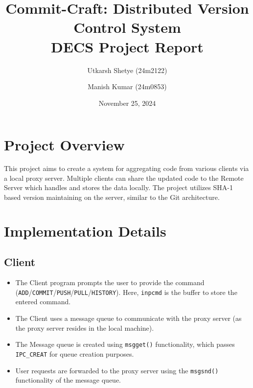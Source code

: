 \documentclass[12pt,a4paper]{article}
\title{Commit-Craft: Distributed Version Control System\\
\large DECS Project Report}
\author{Utkarsh Shetye (24m2122) \and Manish Kumar (24m0853)}
\date{November 25, 2024}
\begin{document}
\maketitle

\section{Project Overview}
This project aims to create a system for aggregating code from various clients via a local proxy server. Multiple clients can share the updated code to the Remote Server which handles and stores the data locally. The project utilizes SHA-1 based version maintaining on the server, similar to the Git architecture.

\section{Implementation Details}

\subsection{Client}
\begin{itemize}
    \item The Client program prompts the user to provide the command (\texttt{ADD}/\texttt{COMMIT}/\texttt{PUSH}/\texttt{PULL}/\texttt{HISTORY}). Here, \texttt{inpcmd} is the buffer to store the entered command.
    \item The Client uses a message queue to communicate with the proxy server (as the proxy server resides in the local machine).
    \item The Message queue is created using \texttt{msgget()} functionality, which passes \texttt{IPC\_CREAT} for queue creation purposes.
    \item User requests are forwarded to the proxy server using the \texttt{msgsnd()} functionality of the message queue.
\end{itemize}
\end{document}
